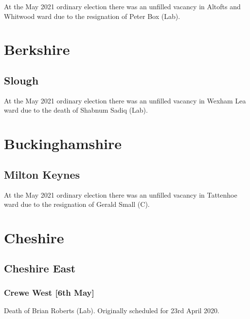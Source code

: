 \documentclass[a4paper,openany]{book}
\begin{document}
\begin{resultsiii}
At the May 2021 ordinary election there was an unfilled vacancy in Altofts and Whitwood ward due to the resignation of Peter Box (Lab).

\section{Berkshire}

\subsection*{Slough}

At the May 2021 ordinary election there was an unfilled vacancy in Wexham Lea ward due to the death of Shabnum Sadiq (Lab).

\section{Buckinghamshire}

\subsection*{Milton Keynes}

At the May 2021 ordinary election there was an unfilled vacancy in Tattenhoe ward due to the resignation of Gerald Small (C).

\section{Cheshire}

\subsection*{Cheshire East}

\subsubsection*{Crewe West \hspace*{\fill}\nolinebreak[1]%
	\enspace\hspace*{\fill}
	[6th May]}


Death of Brian Roberts (Lab).  Originally scheduled for 23rd April 2020.


\end{resultsiii}
\end{document}
